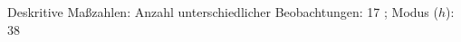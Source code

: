 				\label{tableValues:cjob0521a_g3}
				\vspace*{-\baselineskip}
                    \begin{noten}
                	    \note{} Deskritive Maßzahlen:
                	    Anzahl unterschiedlicher Beobachtungen: 17%
                	    ; 
                	      Modus ($h$): 38
                     \end{noten}


